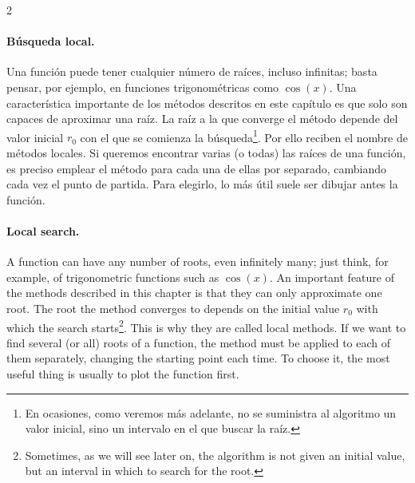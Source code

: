 \begin{paracol}{2}
\paragraph*{Búsqueda local.} Una función puede tener cualquier número de raíces, incluso infinitas; basta pensar, por ejemplo, en funciones trigonométricas como $\cos(x)$. Una característica importante de los métodos descritos en este capítulo es que solo son capaces de aproximar una raíz. La raíz a la que converge el método depende del valor inicial $r_0$ con el que se comienza la búsqueda\footnote{En ocasiones, como veremos más adelante, no se suministra al algoritmo un valor inicial, sino un intervalo en el que buscar la raíz.}. Por ello reciben el nombre de métodos locales. Si queremos encontrar varias (o todas) las raíces de una función, es preciso emplear el método para cada una de ellas por separado, cambiando cada vez el punto de partida. Para elegirlo, lo más útil suele ser dibujar antes la función.
\switchcolumn

\paragraph*{Local search.} A function can have any number of roots, even infinitely many; just think, for example, of trigonometric functions such as $\cos(x)$. An important feature of the methods described in this chapter is that they can only approximate one root. The root the method converges to depends on the initial value $r_0$ with which the search starts\footnote{Sometimes, as we will see later on, the algorithm is not given an initial value, but an interval in which to search for the root.}. This is why they are called local methods. If we want to find several (or all) roots of a function, the method must be applied to each of them separately, changing the starting point each time. To choose it, the most useful thing is usually to plot the function first.
\end{paracol}

